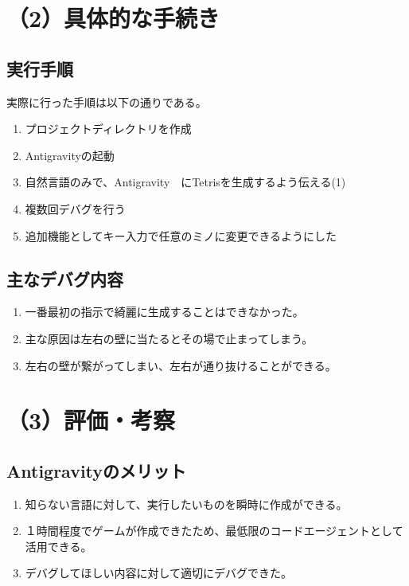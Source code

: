 \documentclass[a4paper,11pt,ja=standard,lualatex]{bxjsarticle}
\begin{document}
\section{（2）具体的な手続き}
\subsection{実行手順}
実際に行った手順は以下の通りである。

\begin{enumerate}[leftmargin=6mm]
  \item プロジェクトディレクトリを作成
  \item Antigravityの起動
  \item 自然言語のみで、Antigravity　にTetrisを生成するよう伝える(1)
  \item 複数回デバグを行う
  \item 追加機能としてキー入力で任意のミノに変更できるようにした
\end{enumerate}


\subsection{主なデバグ内容}
\begin{enumerate}[leftmargin=6mm]
  \item 一番最初の指示で綺麗に生成することはできなかった。
  \item 主な原因は左右の壁に当たるとその場で止まってしまう。
  \item 左右の壁が繋がってしまい、左右が通り抜けることができる。
\end{enumerate}

\section{（3）評価・考察}

\subsection{Antigravityのメリット}
\begin{enumerate}[leftmargin=6mm]
  \item 知らない言語に対して、実行したいものを瞬時に作成ができる。
  \item １時間程度でゲームが作成できたため、最低限のコードエージェントとして活用できる。
  \item デバグしてほしい内容に対して適切にデバグできた。
\end{enumerate}
\end{document}
